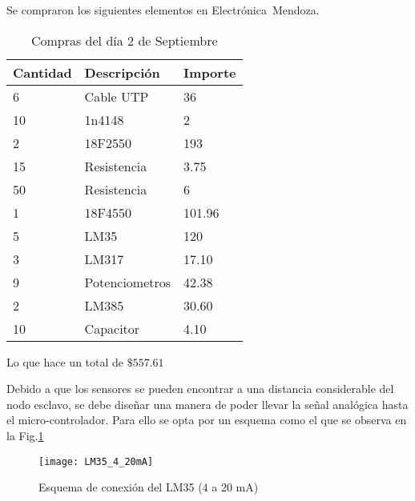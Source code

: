 Se compraron los siguientes elementos en Electrónica~Mendoza.
\begin{table}[H]
  \begin{tabular}{l l l}
    \toprule
    \textbf{Cantidad} & \textbf{Descripción} & \textbf{Importe} \\
    \toprule
    6 	& 	Cable UTP 	& 	36\\
    10  & 	1n4148		& 	2\\
    2	&	18F2550		&	193\\
    15	&	Resistencia	&	3.75\\
    50	&	Resistencia	&	6\\
    1	&	18F4550		&	101.96\\
    5	&	LM35		&	120\\
    3	&	LM317		&	17.10\\
    9	&	Potenciometros	&	42.38\\
    2	&	LM385		&	30.60\\
    10	&	Capacitor	&	4.10\\

    \bottomrule
  \end{tabular}
  \caption{Compras del día 2 de Septiembre}
  \label{tab:compra1}
\end{table}
Lo que hace un total de $\$557.61$



Debido a que los sensores se pueden encontrar a una distancia considerable del nodo esclavo, 
se debe diseñar una manera de poder llevar la señal analógica hasta el micro-controlador. 
Para ello se opta por un esquema como el que se observa en la Fig.\ref{fig:LM35_4_20mA}

\begin{figure}[H] %
  \begin{center}
  \texttt{[image: LM35\_4\_20mA]}
  \end{center}
  \caption{Esquema de conexión del LM35 (4 a 20 mA) }
  \label{fig:LM35_4_20mA}
\end{figure}


